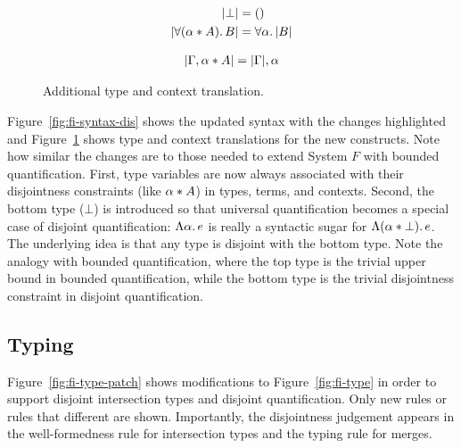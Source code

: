 \begin{figure}

  \begin{align*}
    \lvert \bot \rvert                  &= () \\
    \lvert \forall (\alpha * A).\, B \rvert  &= \forall \alpha.\, \lvert B \rvert \\
  \end{align*}


  \begin{align*}
    \lvert \Gamma, \alpha * A \rvert &= \lvert \Gamma \rvert, \alpha \\
  \end{align*}

  \caption{Additional type and context translation.}
  \label{fig:additional-type-and-context-translation}
\end{figure}


Figure~\ref{fig:fi-syntax-dis} shows the updated syntax with the
changes highlighted and Figure~\ref{fig:additional-type-and-context-translation}
shows type and context translations for the new constructs.
Note how similar the changes are to those needed
to extend System $F$ with bounded quantification. First, type
variables are now always associated with their disjointness
constraints (like $\alpha * A$) in types, terms, and
contexts. Second, the bottom type ($\bot$) is introduced so that
universal quantification becomes a special case of disjoint
quantification: $\Lambda \alpha.\, e$ is really a syntactic sugar for
$\Lambda (\alpha * \bot).\, e$. The underlying idea is that any type is
disjoint with the bottom type.  Note the analogy with bounded
quantification, where the top type is the trivial upper bound in
bounded quantification, while the bottom type is the trivial
disjointness constraint in disjoint quantification.


\subsection{Typing}
Figure~\ref{fig:fi-type-patch} shows modifications to Figure~\ref{fig:fi-type} in
order to support disjoint intersection types and disjoint
quantification. Only new rules or rules that different are shown.
Importantly, the disjointness judgement appears in the well-formedness rule for intersection
types and the typing rule for merges.

